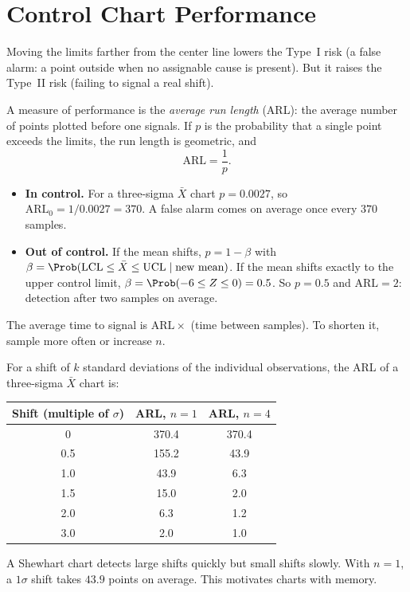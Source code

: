 \section{Control Chart Performance}

Moving the limits farther from the center line lowers the Type~I risk (a false alarm: a point outside when no assignable cause is present). But it raises the Type~II risk (failing to signal a real shift).

A measure of performance is the \emph{average run length} (ARL): the average number of points plotted before one signals. If $p$ is the probability that a single point exceeds the limits, the run length is geometric, and
\[ \mathrm{ARL}=\frac1p. \]

\begin{itemize}
  \item \textbf{In control.} For a three-sigma $\bar{X}$ chart $p=0.0027$, so $\mathrm{ARL}_0=1/0.0027=370$. A false alarm comes on average once every $370$ samples.
  \item \textbf{Out of control.} If the mean shifts, $p=1-\beta$ with $\beta=\Prob(\mathrm{LCL}\le\bar{X}\le\mathrm{UCL}\mid\text{new mean})$. If the mean shifts exactly to the upper control limit, $\beta=\Prob(-6\le Z\le0)=0.5$. So $p=0.5$ and $\mathrm{ARL}=2$: detection after two samples on average.
\end{itemize}
The average time to signal is $\mathrm{ARL}\times$ (time between samples). To shorten it, sample more often or increase $n$.

For a shift of $k$ standard deviations of the individual observations, the ARL of a three-sigma $\bar{X}$ chart is:

\begin{center}
\begin{tabular}{c|cc}
\toprule
Shift (multiple of $\sigma$) & ARL, $n=1$ & ARL, $n=4$\\
\midrule
0 & 370.4 & 370.4\\
0.5 & 155.2 & 43.9\\
1.0 & 43.9 & 6.3\\
1.5 & 15.0 & 2.0\\
2.0 & 6.3 & 1.2\\
3.0 & 2.0 & 1.0\\
\bottomrule
\end{tabular}
\end{center}

A Shewhart chart detects large shifts quickly but small shifts slowly. With $n=1$, a $1\sigma$ shift takes $43.9$ points on average. This motivates charts with memory.

